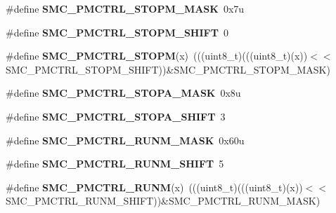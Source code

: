\begin{DoxyCompactItemize}
\#define {\bfseries S\+M\+C\+\_\+\+P\+M\+C\+T\+R\+L\+\_\+\+S\+T\+O\+P\+M\+\_\+\+M\+A\+SK}~0x7u
\item 
\mbox{\label{group___s_m_c___register___masks_gaac7423086f31a8fbbfc8d18b1a876f26}} 
\#define {\bfseries S\+M\+C\+\_\+\+P\+M\+C\+T\+R\+L\+\_\+\+S\+T\+O\+P\+M\+\_\+\+S\+H\+I\+FT}~0
\item 
\mbox{\label{group___s_m_c___register___masks_gaa2ea36f819a21ef6b513564dc1453958}} 
\#define {\bfseries S\+M\+C\+\_\+\+P\+M\+C\+T\+R\+L\+\_\+\+S\+T\+O\+PM}(x)~(((uint8\+\_\+t)(((uint8\+\_\+t)(x))$<$$<$S\+M\+C\+\_\+\+P\+M\+C\+T\+R\+L\+\_\+\+S\+T\+O\+P\+M\+\_\+\+S\+H\+I\+FT))\&S\+M\+C\+\_\+\+P\+M\+C\+T\+R\+L\+\_\+\+S\+T\+O\+P\+M\+\_\+\+M\+A\+SK)
\item 
\mbox{\label{group___s_m_c___register___masks_gadd72ad662b62a7b51225b529fef2c77a}} 
\#define {\bfseries S\+M\+C\+\_\+\+P\+M\+C\+T\+R\+L\+\_\+\+S\+T\+O\+P\+A\+\_\+\+M\+A\+SK}~0x8u
\item 
\mbox{\label{group___s_m_c___register___masks_gadfe89210f121f10b74f2fba55f059e1d}} 
\#define {\bfseries S\+M\+C\+\_\+\+P\+M\+C\+T\+R\+L\+\_\+\+S\+T\+O\+P\+A\+\_\+\+S\+H\+I\+FT}~3
\item 
\mbox{\label{group___s_m_c___register___masks_ga1a456925e291d6d53f4891b25fcaf8eb}} 
\#define {\bfseries S\+M\+C\+\_\+\+P\+M\+C\+T\+R\+L\+\_\+\+R\+U\+N\+M\+\_\+\+M\+A\+SK}~0x60u
\item 
\mbox{\label{group___s_m_c___register___masks_ga8f8dc472f4a4b6ad1babae518c44d55e}} 
\#define {\bfseries S\+M\+C\+\_\+\+P\+M\+C\+T\+R\+L\+\_\+\+R\+U\+N\+M\+\_\+\+S\+H\+I\+FT}~5
\item 
\mbox{\label{group___s_m_c___register___masks_gaa375b91daca0dd7f4b1452da903b5bdc}} 
\#define {\bfseries S\+M\+C\+\_\+\+P\+M\+C\+T\+R\+L\+\_\+\+R\+U\+NM}(x)~(((uint8\+\_\+t)(((uint8\+\_\+t)(x))$<$$<$S\+M\+C\+\_\+\+P\+M\+C\+T\+R\+L\+\_\+\+R\+U\+N\+M\+\_\+\+S\+H\+I\+FT))\&S\+M\+C\+\_\+\+P\+M\+C\+T\+R\+L\+\_\+\+R\+U\+N\+M\+\_\+\+M\+A\+SK)
\item 

\end{DoxyCompactItemize}

